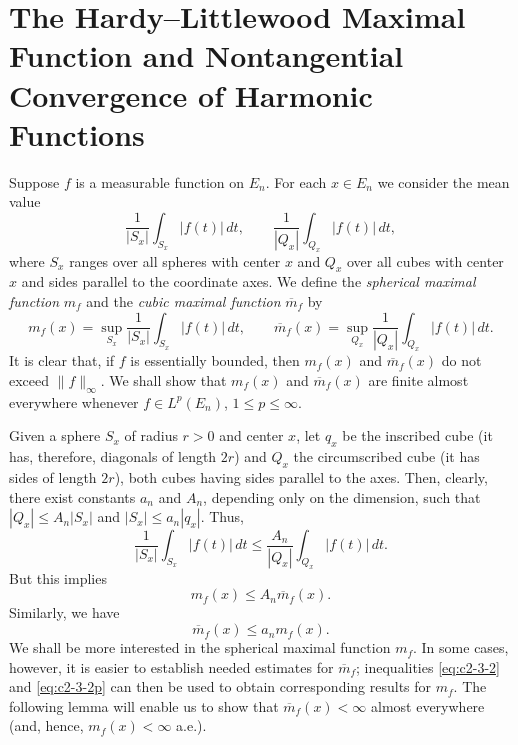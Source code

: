 \section{The Hardy--Littlewood Maximal Function and Nontangential Convergence of Harmonic Functions}

Suppose $f$ is a measurable function on $E_n$. For each $x \in E_n$ we consider the mean value
\[
\frac{1}{|S_x|} \int_{S_x} |f(t)|\,dt, \qquad \frac{1}{|Q_x|} \int_{Q_x} |f(t)|\,dt,
\]
where $S_x$ ranges over all spheres with center $x$ and $Q_x$ over all cubes with center $x$ and sides parallel to the coordinate axes. We define the \emph{spherical maximal function} $m_f$ and the \emph{cubic maximal function} $\overline{m}_f$ by
\begin{equation}\label{eq:c2-3-1}
m_f(x) = \sup_{S_x} \frac{1}{|S_x|} \int_{S_x} |f(t)|\,dt, \qquad
\overline{m}_f(x) = \sup_{Q_x} \frac{1}{|Q_x|} \int_{Q_x} |f(t)|\,dt.
\end{equation}
It is clear that, if $f$ is essentially bounded, then $m_f(x)$ and $\overline{m}_f(x)$ do not exceed $\|f\|_\infty$. We shall show that $m_f(x)$ and $\overline{m}_f(x)$ are finite almost everywhere whenever $f \in L^p(E_n)$, $1 \leq p \leq \infty$.

Given a sphere $S_x$ of radius $r > 0$ and center $x$, let $q_x$ be the inscribed cube (it has, therefore, diagonals of length $2r$) and $Q_x$ the circumscribed cube (it has sides of length $2r$), both cubes having sides parallel to the axes. Then, clearly, there exist constants $a_n$ and $A_n$, depending only on the dimension, such that $|Q_x| \leq A_n |S_x|$ and $|S_x| \leq a_n |q_x|$. Thus,
\[
\frac{1}{|S_x|} \int_{S_x} |f(t)|\,dt \leq \frac{A_n}{|Q_x|} \int_{Q_x} |f(t)|\,dt.
\]
But this implies
\begin{equation}\label{eq:c2-3-2}
m_f(x) \leq A_n \overline{m}_f(x).
\end{equation}
Similarly, we have
\begin{equation}\tag{3.2$'$}\label{eq:c2-3-2p}
\overline{m}_f(x) \leq a_n m_f(x).
\end{equation}
We shall be more interested in the spherical maximal function $m_f$. In some cases, however, it is easier to establish needed estimates for $\overline{m}_f$; inequalities \eqref{eq:c2-3-2} and \eqref{eq:c2-3-2p} can then be used to obtain corresponding results for $m_f$. The following lemma will enable us to show that $\overline{m}_f(x) < \infty$ almost everywhere (and, hence, $m_f(x) < \infty$ a.e.).

